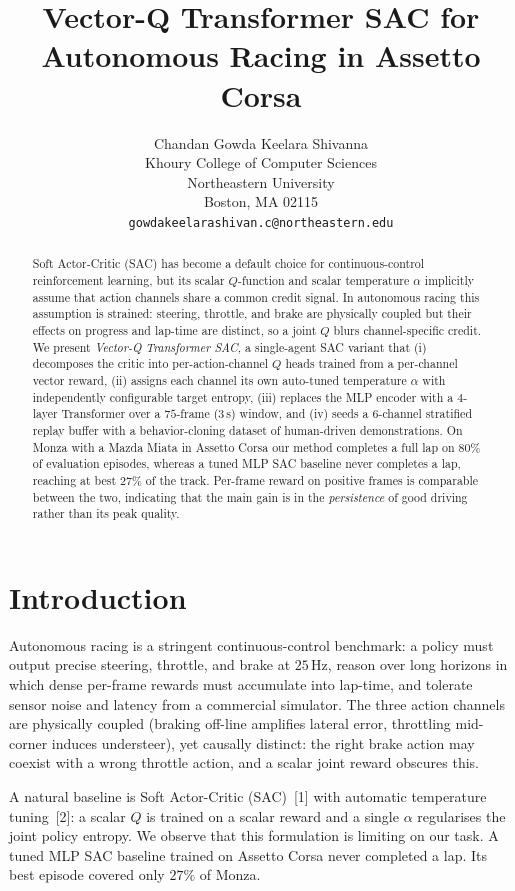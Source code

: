 \documentclass{article}
\title{Vector-Q Transformer SAC for Autonomous Racing in Assetto Corsa}
\author{%
  Chandan Gowda Keelara Shivanna \\
  Khoury College of Computer Sciences \\
  Northeastern University \\
  Boston, MA 02115 \\
  \texttt{gowdakeelarashivan.c@northeastern.edu}
}
\begin{document}
\maketitle

\begin{abstract}
  Soft Actor-Critic (SAC) has become a default choice for continuous-control
  reinforcement learning, but its scalar $Q$-function and scalar
  temperature $\alpha$ implicitly assume that action channels share a
  common credit signal. In autonomous racing this assumption is strained:
  steering, throttle, and brake are physically coupled but their effects
  on progress and lap-time are distinct, so a joint $Q$ blurs
  channel-specific credit. We present \emph{Vector-Q Transformer SAC}, a
  single-agent SAC variant that (i) decomposes the critic into
  per-action-channel $Q$ heads trained from a per-channel vector reward,
  (ii) assigns each channel its own auto-tuned temperature $\alpha$ with
  independently configurable target entropy, (iii) replaces the MLP
  encoder with a $4$-layer Transformer over a $75$-frame (3\,s) window,
  and (iv) seeds a $6$-channel stratified replay buffer with a
  behavior-cloning dataset of human-driven demonstrations. On Monza
  with a Mazda Miata in Assetto Corsa our method
  completes a full lap on $80\%$ of evaluation episodes, whereas a
  tuned MLP SAC baseline never completes a lap, reaching at best
  $27\%$ of the track.
  Per-frame reward on positive frames is comparable between the two,
  indicating that the main gain is in the \emph{persistence} of good
  driving rather than its peak quality.
\end{abstract}

\section{Introduction}
\label{sec:intro}

Autonomous racing is a stringent continuous-control benchmark: a policy
must output precise steering, throttle, and brake at $25$\,Hz, reason
over long horizons in which dense per-frame rewards must accumulate
into lap-time, and tolerate sensor noise and latency from a commercial
simulator. The three action channels are physically coupled (braking
off-line amplifies lateral error, throttling mid-corner induces
understeer), yet causally distinct: the right brake action may coexist
with a wrong throttle action, and a scalar joint reward obscures this.

A natural baseline is Soft Actor-Critic (SAC)~[1] with automatic
temperature tuning~[2]: a scalar $Q$ is trained on a scalar reward and
a single $\alpha$ regularises the joint policy entropy. We observe
that this formulation is limiting on our task. A tuned MLP SAC
baseline trained on Assetto Corsa never completed a lap. Its best
episode covered only $27\%$ of Monza.
\end{document}
